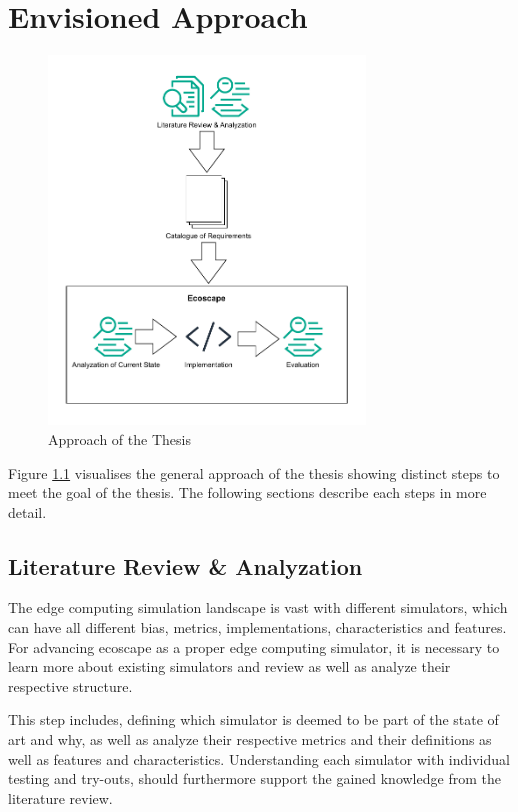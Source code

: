 \chapter{Envisioned Approach}
\begin{figure}
  \centering
  \includegraphics[width=0.75\textwidth]{img/approach_figure.pdf}
  \caption{Approach of the Thesis}
  \label{fig:approach_figure}
\end{figure}
Figure \ref{fig:approach_figure} visualises the general approach of the thesis showing distinct steps to meet the goal of the thesis.
The following sections describe each steps in more detail.

\section{Literature Review \& Analyzation}\label{approach:literature-review}
The edge computing simulation landscape is vast with different simulators, which can have all different bias, metrics, implementations, characteristics and features.
For advancing ecoscape as a proper edge computing simulator, it is necessary to learn more about existing simulators and review as well as analyze their respective structure.

This step includes, defining which simulator is deemed to be part of the state of art and why, as well as analyze their respective metrics and their definitions as well as features and characteristics.
Understanding each simulator with individual testing and try-outs, should furthermore support the gained knowledge from the literature review. 

